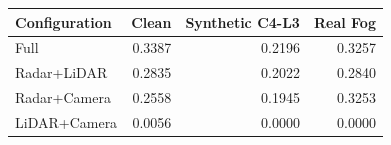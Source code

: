 \begin{tabular}{lrrr}
\toprule
Configuration & Clean & Synthetic C4-L3 & Real Fog \\
\midrule
Full & 0.3387 & 0.2196 & 0.3257 \\
Radar+LiDAR & 0.2835 & 0.2022 & 0.2840 \\
Radar+Camera & 0.2558 & 0.1945 & 0.3253 \\
LiDAR+Camera & 0.0056 & 0.0000 & 0.0000 \\
\bottomrule
\end{tabular}
